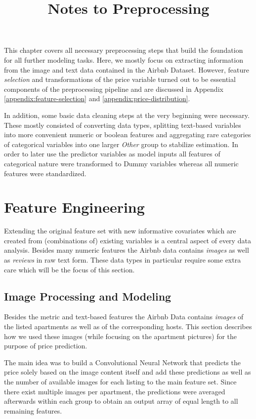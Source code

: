 \documentclass[12pt, letterpaper]{article}
\title{Notes to Preprocessing}
\author{}
\date{}
\begin{document}
\maketitle

This chapter covers all necessary preprocessing steps that build the foundation for all further modeling tasks.
Here, we mostly focus on extracting information from the image and text data contained in the Airbnb Dataset.
However, feature \emph{selection} and transformations of the price variable turned out to be essential components of the preprocessing pipeline and are discussed in Appendix \ref{appendix:feature-selection} and \ref{appendix:price-distribution}.

In addition, some basic data cleaning steps at the very beginning were necessary.
These mostly consisted of converting data types, splitting text-based variables into more convenient numeric or boolean features and aggregating rare categories of categorical variables into one larger \emph{Other} group to stabilize estimation.
In order to later use the predictor variables as model inputs all features of categorical nature were transformed to Dummy variables whereas all numeric features were standardized.

\section{Feature Engineering}

Extending the original feature set with new informative covariates which are created from (combinations of) existing variables is a central aspect of every data analysis.
Besides many numeric features the Airbnb data contains \emph{images} as well as \emph{reviews} in raw text form.
These data types in particular require some extra care which will be the focus of this section.

\subsection{Image Processing and Modeling}

Besides the metric and text-based features the Airbnb Data contains \emph{images} of the listed apartments as well as of the corresponding hosts.
This section describes how we used these images (while focusing on the apartment pictures) for the purpose of price prediction.

The main idea was to build a Convolutional Neural Network that predicts the price solely based on the image content itself and add these predictions as well as the number of available images for each listing to the main feature set.
Since there exist multiple images per apartment, the predictions were averaged afterwards within each group to obtain an output array of equal length to all remaining features.
\end{document}
